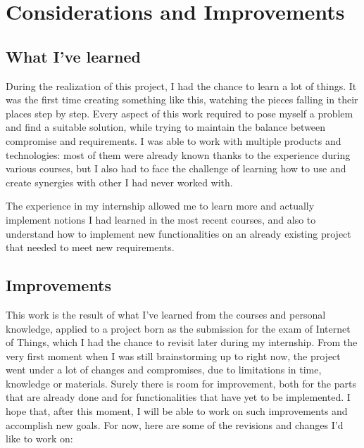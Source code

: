 \documentclass[target=bach,aauheader=,style=]{thud}
\begin{document}
\chapter{Considerations and Improvements}
\section{What I've learned}
During the realization of this project, I had the chance to learn a lot of things. It was the first time creating something like this, watching the pieces falling in their places step by step. Every aspect of this work required to pose myself a problem and find a suitable solution, while trying to maintain the balance between compromise and requirements. I was able to work with multiple products and technologies: most of them were already known thanks to the experience during various courses, but I also had to face the challenge of learning how to use and create synergies with other I had never worked with.

The experience in my internship allowed me to learn more and actually implement notions I had learned in the most recent courses, and also to understand how to implement new functionalities on an already existing project that needed to meet new requirements.


\section{Improvements}

This work is the result of what I've learned from the courses and personal knowledge, applied to a project born as the submission for the exam of Internet of Things, which I had the chance to revisit later during my internship. From the very first moment when I was still brainstorming up to right now, the project went under a lot of changes and compromises, due to limitations in time, knowledge or materials. Surely there is room for improvement, both for the parts that are already done and for functionalities that have yet to be implemented. I hope that, after this moment, I will be able to work on such improvements and accomplish new goals. For now, here are some of the revisions and changes I'd like to work on:
\end{document}
